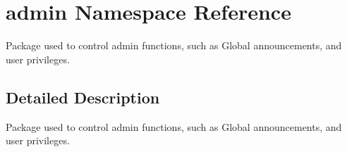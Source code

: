 \hypertarget{namespaceadmin}{}\section{admin Namespace Reference}
\label{namespaceadmin}


Package used to control admin functions, such as Global announcements, and user privileges.  




\subsection{Detailed Description}
Package used to control admin functions, such as Global announcements, and user privileges. 